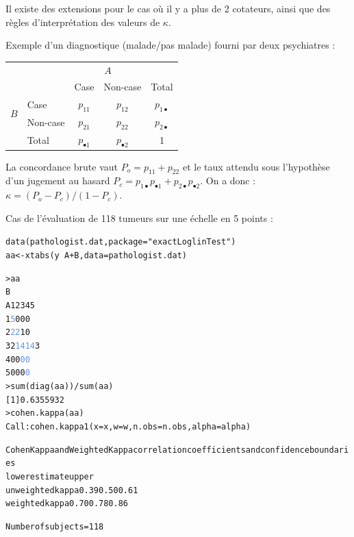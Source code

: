 Il existe des extensions pour le cas où il y a plus de 2
cotateurs\autocite{siegel88}, ainsi que des règles d'interprétation des valeurs
de $\kappa$\autocite{fleiss81b}.


Exemple d'un diagnostique (malade/pas malade) fourni par deux
psychiatres\autocite{dunn00} :
\begin{center}
\small
\begin{tabular}{l|l|cc|c|}
\multicolumn{2}{c}{}& \multicolumn{2}{c}{$A$} & \multicolumn{1}{c}{}\\
\cline{3-5}
\multicolumn{2}{c|}{}& Case & Non-case & Total\\
\cline{2-5}
\multirow{2}{*}{$B$} & Case & $p_{11}$ & $p_{12}$ & $p_{1\bullet}$\\
& Non-case & $p_{21}$ & $p_{22}$ & $p_{2\bullet}$\\
\cline{2-5}
& Total & $p_{\bullet 1}$ & $p_{\bullet 2}$ & 1\\
\cline{2-5}
\end{tabular}
\end{center}
\medskip

La concordance brute vaut $P_o=p_{11}+p_{22}$ et le taux attendu sous
l'hypothèse d'un jugement au hasard $P_c=p_{1\bullet}p_{\bullet
  1}+p_{2\bullet}p_{\bullet 2}$. \newline
On a donc : $\kappa=(P_o-P_c) / (1-P_c)$.




Cas de l'évaluation de 118 tumeurs sur une échelle en 5 points\autocite{agresti90} :
\begin{alltt}
data(pathologist.dat, package = "exactLoglinTest")
aa <- xtabs(y ~ A + B, data = pathologist.dat)
\end{alltt}
\begin{alltt}\small
> aa
   B
A    1  2  3  4  5
  1   \textcolor{CornflowerBlue}{5}  0  0  0
  2  \textcolor{CornflowerBlue}{2}    \textcolor{CornflowerBlue}{2}  1  0
  3  2 \textcolor{CornflowerBlue}{14}  \textcolor{CornflowerBlue}{14}  3
  4  0  0  \textcolor{CornflowerBlue}{0}    \textcolor{CornflowerBlue}{0}
  5  0  0  0  \textcolor{CornflowerBlue}{0}  
> sum(diag(aa))/sum(aa)  \hfill{}
[1] 0.6355932
> cohen.kappa(aa)
Call: cohen.kappa1(x = x, w = w, n.obs = n.obs, alpha = alpha)

Cohen Kappa and Weighted Kappa correlation coefficients and confidence boundaries
                 lower estimate upper
unweighted kappa  0.39     0.50  0.61
weighted kappa    0.70     0.78  0.86  \hfill{}

 Number of subjects = 118
\end{alltt}


